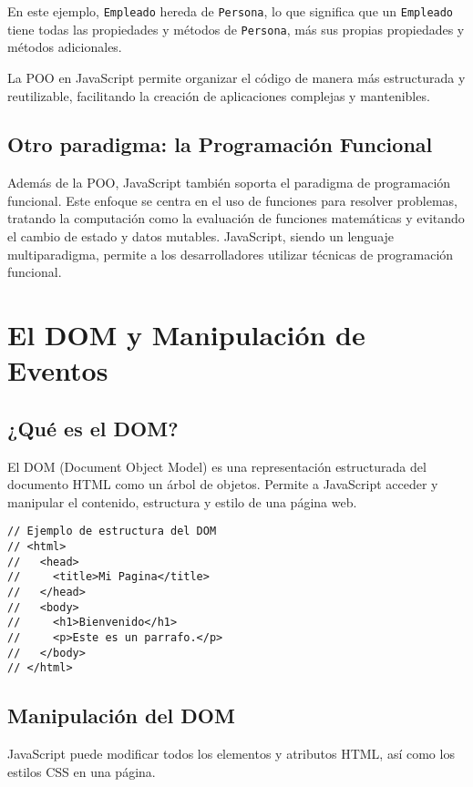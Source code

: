 \documentclass{book}
\begin{document}
En este ejemplo, \texttt{Empleado} hereda de \texttt{Persona}, lo que significa que un \texttt{Empleado} tiene todas las propiedades y métodos de \texttt{Persona}, más sus propias propiedades y métodos adicionales.

La POO en JavaScript permite organizar el código de manera más estructurada y reutilizable, facilitando la creación de aplicaciones complejas y mantenibles.

\subsection{Otro paradigma: la Programación Funcional}

Además de la POO, JavaScript también soporta el paradigma de programación funcional. Este enfoque se centra en el uso de funciones para resolver problemas, tratando la computación como la evaluación de funciones matemáticas y evitando el cambio de estado y datos mutables. JavaScript, siendo un lenguaje multiparadigma, permite a los desarrolladores utilizar técnicas de programación funcional.


\section{El DOM y Manipulación de Eventos}

\subsection{¿Qué es el DOM?}

El DOM (Document Object Model) es una representación estructurada del documento HTML como un árbol de objetos. Permite a JavaScript acceder y manipular el contenido, estructura y estilo de una página web.

\begin{lstlisting}[language=HTML5]
// Ejemplo de estructura del DOM
// <html>
//   <head>
//     <title>Mi Pagina</title>
//   </head>
//   <body>
//     <h1>Bienvenido</h1>
//     <p>Este es un parrafo.</p>
//   </body>
// </html>
\end{lstlisting}

\subsection{Manipulación del DOM}

JavaScript puede modificar todos los elementos y atributos HTML, así como los estilos CSS en una página.
\end{document}
